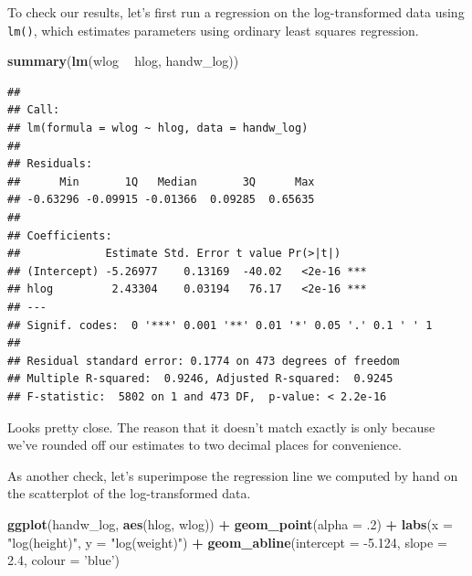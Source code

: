 \documentclass[]{book}
\newenvironment{Shaded}{\begin{snugshade}}{\end{snugshade}}
\newcommand{\DataTypeTok}[1]{\textcolor[rgb]{0.13,0.29,0.53}{#1}}
\newcommand{\FloatTok}[1]{\textcolor[rgb]{0.00,0.00,0.81}{#1}}
\newcommand{\KeywordTok}[1]{\textcolor[rgb]{0.13,0.29,0.53}{\textbf{#1}}}
\newcommand{\NormalTok}[1]{#1}
\newcommand{\OperatorTok}[1]{\textcolor[rgb]{0.81,0.36,0.00}{\textbf{#1}}}
\newcommand{\StringTok}[1]{\textcolor[rgb]{0.31,0.60,0.02}{#1}}
\begin{document}
To check our results, let's first run a regression on the log-transformed data using \texttt{lm()}, which estimates parameters using ordinary least squares regression.

\begin{Shaded}
\begin{Highlighting}[]
\KeywordTok{summary}\NormalTok{(}\KeywordTok{lm}\NormalTok{(wlog }\OperatorTok{~}\StringTok{ }\NormalTok{hlog, handw_log))}
\end{Highlighting}
\end{Shaded}

\begin{verbatim}
## 
## Call:
## lm(formula = wlog ~ hlog, data = handw_log)
## 
## Residuals:
##      Min       1Q   Median       3Q      Max 
## -0.63296 -0.09915 -0.01366  0.09285  0.65635 
## 
## Coefficients:
##             Estimate Std. Error t value Pr(>|t|)    
## (Intercept) -5.26977    0.13169  -40.02   <2e-16 ***
## hlog         2.43304    0.03194   76.17   <2e-16 ***
## ---
## Signif. codes:  0 '***' 0.001 '**' 0.01 '*' 0.05 '.' 0.1 ' ' 1
## 
## Residual standard error: 0.1774 on 473 degrees of freedom
## Multiple R-squared:  0.9246,	Adjusted R-squared:  0.9245 
## F-statistic:  5802 on 1 and 473 DF,  p-value: < 2.2e-16
\end{verbatim}

Looks pretty close. The reason that it doesn't match exactly is only because we've rounded off our estimates to two decimal places for convenience.

As another check, let's superimpose the regression line we computed by hand on the scatterplot of the log-transformed data.

\begin{Shaded}
\begin{Highlighting}[]
\KeywordTok{ggplot}\NormalTok{(handw_log, }\KeywordTok{aes}\NormalTok{(hlog, wlog)) }\OperatorTok{+}
\StringTok{  }\KeywordTok{geom_point}\NormalTok{(}\DataTypeTok{alpha =} \FloatTok{.2}\NormalTok{) }\OperatorTok{+}
\StringTok{  }\KeywordTok{labs}\NormalTok{(}\DataTypeTok{x =} \StringTok{"log(height)"}\NormalTok{, }\DataTypeTok{y =} \StringTok{"log(weight)"}\NormalTok{) }\OperatorTok{+}
\StringTok{  }\KeywordTok{geom_abline}\NormalTok{(}\DataTypeTok{intercept =} \FloatTok{-5.124}\NormalTok{, }\DataTypeTok{slope =} \FloatTok{2.4}\NormalTok{, }\DataTypeTok{colour =} \StringTok{'blue'}\NormalTok{)}
\end{Highlighting}
\end{Shaded}
\end{document}
